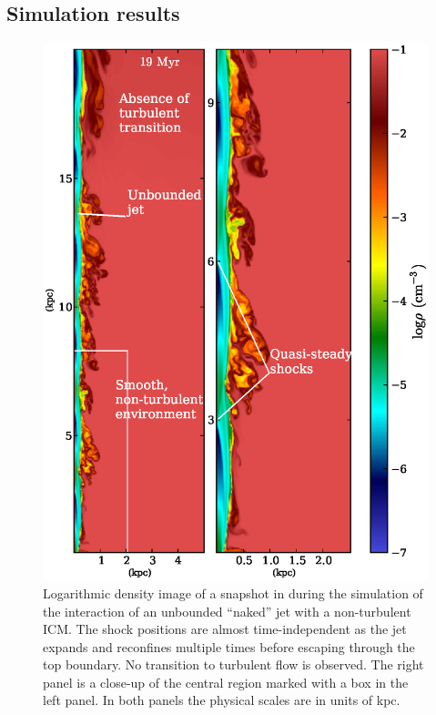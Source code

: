 \subsection{Simulation results} \label{s:jet_stream}
\begin{figure}
\includegraphics[width=\linewidth]{njm.eps}
\caption{Logarithmic density image of a snapshot in during the simulation of the interaction of an unbounded ``naked'' jet with a non-turbulent ICM. The shock positions are almost time-independent as the jet expands and reconfines multiple times before escaping through the top boundary. No transition to turbulent flow is observed. The right panel is a close-up of the central region marked with a box in the left panel. In both panels the physical scales are in units of kpc.}
\label{f:u_jet}
\end{figure}

